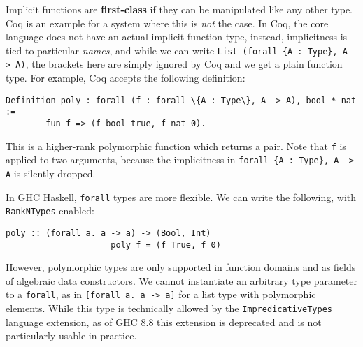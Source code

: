 \documentclass[acmsmall,review,anonymous,prologue,dvipsnames]{acmart}\settopmatter{printfolios=true,printccs=false,printacmref=false}
\begin{document}
Implicit functions are \textbf{first-class} if they can be manipulated like any
other type. Coq is an example for a system where this is \emph{not} the case.
In Coq, the core language does not have an actual implicit function type,
instead, implicitness is tied to particular \emph{names}, and while we can write
\texttt{List (forall \{A : Type\}, A -> A)}, the brackets here are simply
ignored by Coq and we get a plain function type. For example, Coq accepts the
following definition:
\begin{Verbatim}[commandchars=\\\{\}]
      Definition poly : forall (f : forall \{A : Type\}, A -> A), bool * nat :=
        fun f => (f bool true, f nat 0).
\end{Verbatim}
This is a higher-rank polymorphic function which returns a pair. Note that
\texttt{f} is applied to two arguments, because the implicitness in
\texttt{forall \{A : Type\}, A -> A} is silently dropped.

In GHC Haskell, \texttt{forall} types are more flexible. We can write
the following, with \texttt{RankNTypes} enabled:
\begin{Verbatim}[commandchars=\\\{\}]
                     poly :: (forall a. a -> a) -> (Bool, Int)
                     poly f = (f True, f 0)
\end{Verbatim}
However, polymorphic types are only supported in function domains and as fields
of algebraic data constructors. We cannot instantiate an arbitrary type
parameter to a \texttt{forall}, as in \texttt{[forall a. a -> a]} for a list
type with polymorphic elements. While this type is technically allowed by the
\texttt{ImpredicativeTypes} language extension, as of GHC 8.8 this extension is
deprecated and is not particularly usable in practice.
\end{document}
